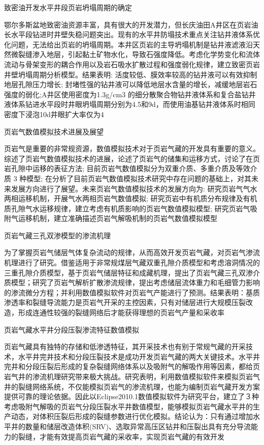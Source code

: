 \documentclass{article}
\begin{document}
致密油开发水平井段页岩坍塌周期的确定

鄂尔多斯盆地致密油资源丰富，具有很大的开发潜力，但长庆油田A井区在页岩油长水平段钻进时井壁失稳问题突出。现有的水平井防塌技术重点关注钻井液体系优化问题，无法给出页岩的坍塌周期。本井区页岩的主导坍塌机制是钻井液滤液沿天然微裂缝渗入地层，引起黏土矿物水化，导致石强度降低。考虑化学势变化和流体流动与骨架变形的耦合作用以及岩石吸水扩散过程和强度弱化规律，建立致密页岩井壁坍塌周期分析模型。结果表明: 活度较低、膜效率较高的钻井液可以有效抑制地层孔隙压力增长; 封堵性强的钻井液可以降低地层水含量的增长，减缓地层岩石强度的弱化;A井区使用密度为1.3g/cm3 的细分散聚合物钻井液体系和复合盐钻井液体系钻进水平段时井眼坍塌周期分别为4.5和9d，而使用油基钻井液体系时相同密度下浸泡10d井眼扩大率仅为4%

页岩气数值模拟技术进展及展望

页岩气是重要的非常规资源，数值模拟技术对于页岩气藏的开发具有重要的意义。综述了页岩气数值模拟技术的进展，论述了页岩气的储集和运移方式，讨论了在页岩孔隙中运移的表征方法; 目前页岩气数值模拟分为双重介质、多重介质及等效介质 3 种模型; 在分析了目前页岩气数值模拟技术研究中存在问题的基础上，对其未来发展方向进行了展望。未来页岩气数值模拟技术的发展方向为: 研究页岩气气水两相运移机制，开展气水两相页岩气数值模拟; 研究页岩中有机质分布规律及有机质孔隙气水运移规律，建立考虑有机质影响的页岩气数值模拟模型; 研究页岩气吸附气运移机制，建立准确描述页岩气解吸机制的页岩气数值模拟模型

页岩气藏三孔双渗模型的渗流机理

为了掌握页岩气储层气体复杂流动的规律，从而高效开发页岩气藏，对页岩气渗流机理进行了研究。借鉴适用于非常规煤层气藏双重孔隙介质模型和考虑溶洞情况的三重孔隙介质模型，基于页岩气储层特征和成藏机理，提出了页岩气藏三孔双渗介质模型；研究了页岩气解析扩散渗流规律，提出考虑储层流体重力和毛细管力影响的渗流微分方程；并利用数值模拟软件对页岩气产能进行了预测。结果表明：基质渗透率和裂缝导流能力是页岩气开采的主控因素，只有对储层进行大规模压裂改造，形成连通性较强的裂缝网络后才能获得理想的页岩气产量和采收率

页岩气藏水平井分段压裂渗流特征数值模拟

页岩气藏具有独特的存储和低渗透特征，其开采技术也有别于常规气藏的开采技术，水平井完井技术和分段压裂技术是成功开发页岩气藏的两大关键技术。水平井完井和分段压裂后形成的复杂裂缝网络体系以及吸附气的解吸作用等因素，都给页岩气井的渗流机理研究带来极大挑战。研究表明，利用数值模拟软件来模拟页岩气井的裂缝网络系统，不仅能模拟页岩气的渗流机理，也能为编制页岩气藏开发方案提供可靠的理论依据。因此以Eclipse2010.1数值模拟软件为研究平台，建立了３种考虑吸附气解吸的页岩气分段压裂水平井数值模型，能够模拟页岩气藏水平井的生产动态，对体积压裂后形成的裂缝参数进行优化模拟。结论认为：只有通过增加水平井的数量和储层改造体积(SRV)、选取异常高压区钻井和压裂出具有充分导流能力的裂缝，才能有效提高页岩气藏的采收率，实现页岩气藏的有效开发
\end{document}
